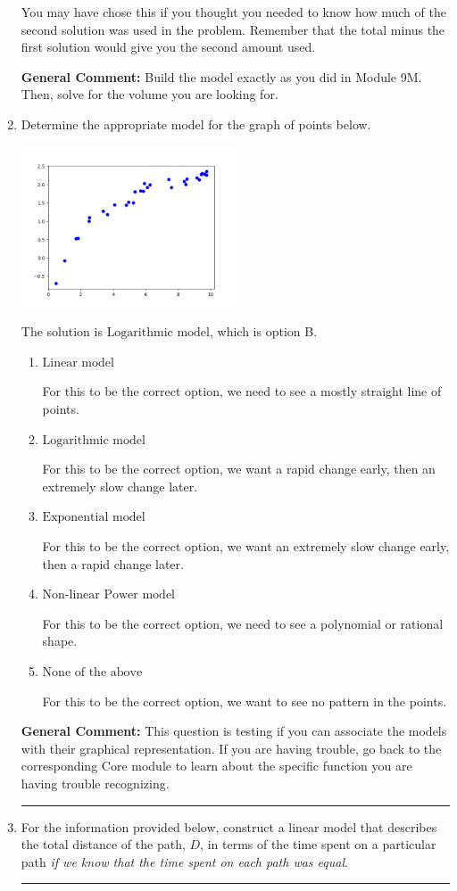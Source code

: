 \documentclass{extbook}[14pt]
\newcommand{\litem}[1]{\item #1

\rule{\textwidth}{0.4pt}}
\begin{document}
\begin{enumerate}
{\begin{enumerate}[label=\Alph*.]
You may have chose this if you thought you needed to know how much of the second solution was used in the problem. Remember that the total minus the first solution would give you the second amount used.
\end{enumerate}

\textbf{General Comment:} Build the model exactly as you did in Module 9M. Then, solve for the volume you are looking for.
}
\litem{
Determine the appropriate model for the graph of points below.

\begin{center}
    \includegraphics[width=0.5\textwidth]{../Figures/identifyModelGraph12B.png}
\end{center}


The solution is \( \text{Logarithmic model} \), which is option B.\begin{enumerate}[label=\Alph*.]
\item \( \text{Linear model} \)

For this to be the correct option, we need to see a mostly straight line of points.
\item \( \text{Logarithmic model} \)

For this to be the correct option, we want a rapid change early, then an extremely slow change later.
\item \( \text{Exponential model} \)

For this to be the correct option, we want an extremely slow change early, then a rapid change later.
\item \( \text{Non-linear Power model} \)

For this to be the correct option, we need to see a polynomial or rational shape.
\item \( \text{None of the above} \)

For this to be the correct option, we want to see no pattern in the points.
\end{enumerate}

\textbf{General Comment:} This question is testing if you can associate the models with their graphical representation. If you are having trouble, go back to the corresponding Core module to learn about the specific function you are having trouble recognizing.
}
\litem{
For the information provided below, construct a linear model that describes the total distance of the path, $D$, in terms of the time spent on a particular path \textit{if we know that the time spent on each path was equal}.

}
\end{enumerate}
\end{document}
